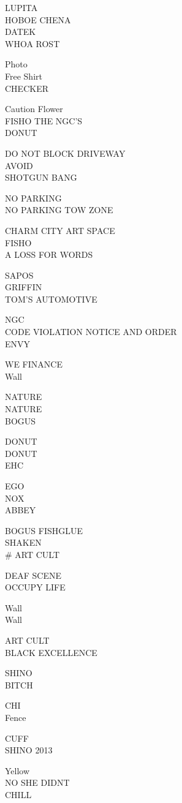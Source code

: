 \documentclass[10pt,letterpaper]{article}
\begin{document}
LUPITA\\
HOBOE CHENA\\
DATEK\\
WHOA ROST

Photo\\
Free Shirt\\
CHECKER

Caution Flower\\
FISHO THE NGC'S\\
DONUT

DO NOT BLOCK DRIVEWAY\\
AVOID\\
SHOTGUN BANG

NO PARKING\\
NO PARKING TOW ZONE

CHARM CITY ART SPACE\\
FISHO\\
A LOSS FOR WORDS

SAPOS\\
GRIFFIN\\
TOM'S AUTOMOTIVE

NGC\\
CODE VIOLATION NOTICE AND ORDER\\
ENVY

WE FINANCE\\
Wall

NATURE\\
NATURE\\
BOGUS

DONUT\\
DONUT\\
EHC

EGO\\
NOX\\
ABBEY

BOGUS FISHGLUE\\
SHAKEN\\
\# ART CULT

DEAF SCENE\\
OCCUPY LIFE

Wall\\
Wall

ART CULT\\
BLACK EXCELLENCE

SHINO\\
BITCH

CHI\\
Fence

CUFF\\
SHINO 2013

Yellow\\
NO SHE DIDNT\\
CHILL
\end{document}
